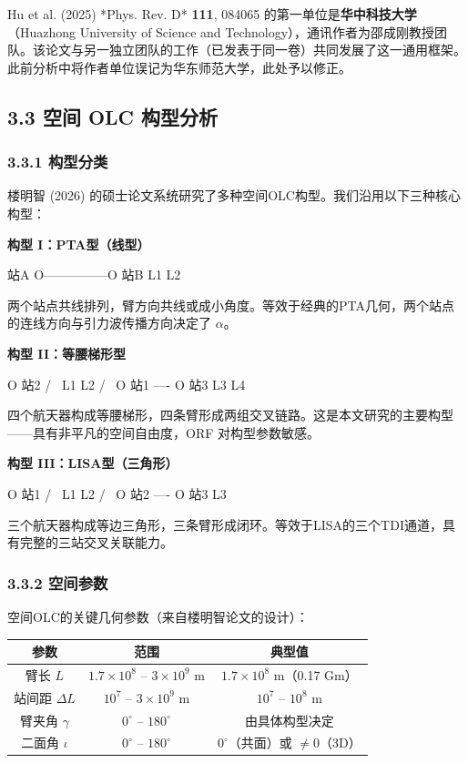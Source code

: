 \documentclass[12pt,a4paper]{article}
\begin{document}
Hu et al. (2025) *Phys. Rev. D* \textbf{111}, 084065 的第一单位是\textbf{华中科技大学}（Huazhong University of Science and Technology），通讯作者为邵成刚教授团队。该论文与另一独立团队的工作（已发表于同一卷）共同发展了这一通用框架。此前分析中将作者单位误记为华东师范大学，此处予以修正。

\subsection{3.3 空间 OLC 构型分析}


\subsubsection{3.3.1 构型分类}


楼明智 (2026) 的硕士论文系统研究了多种空间OLC构型。我们沿用以下三种核心构型：

\textbf{构型 I：PTA型（线型）}

站A O---------------O 站B
L1                  L2

两个站点共线排列，臂方向共线或成小角度。等效于经典的PTA几何，两个站点的连线方向与引力波传播方向决定了 $\alpha$。

\textbf{构型 II：等腰梯形型}

O 站2
/ \
L1  L2
/     \
O 站1 ---- O 站3
L3    L4

四个航天器构成等腰梯形，四条臂形成两组交叉链路。这是本文研究的主要构型——具有非平凡的空间自由度，ORF 对构型参数敏感。

\textbf{构型 III：LISA型（三角形）}

O 站1
/ \
L1  L2
/     \
O 站2 ---- O 站3
L3

三个航天器构成等边三角形，三条臂形成闭环。等效于LISA的三个TDI通道，具有完整的三站交叉关联能力。

\subsubsection{3.3.2 空间参数}


空间OLC的关键几何参数（来自楼明智论文的设计）\cite{ref10}：

\begin{tabular}{|c|c|c|}
\hline
参数 & 范围 & 典型值 \\
\hline
臂长 $L$ & $1.7 \times 10^8$ – $3 \times 10^9$ m & $1.7 \times 10^8$ m（0.17 Gm） \\
站间距 $\Delta L$ & $10^7$ – $3 \times 10^9$ m & $10^7$ – $10^8$ m \\
臂夹角 $\gamma$ & $0^\circ$ -- $180^\circ$ & 由具体构型决定 \\
二面角 $\iota$ & $0^\circ$ -- $180^\circ$ & $0^\circ$（共面）或 $\neq 0$（3D） \\
\hline
\end{tabular}
\end{document}
